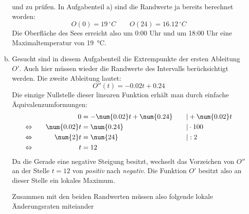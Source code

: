 \begin{exercise}
\begin{enumerate}[a)]
            und zu prüfen.
            In Aufgabenteil a) sind die Randwerte
            ja bereits berechnet worden:
            \begin{equation*}
              O(0)=\num{19}\,{}^\circ C
              \qquad
              O(24)=\num{16.12}\,{}^\circ C
            \end{equation*}
            Die Oberfläche des Sees erreicht also um
            0:00 Uhr und um 18:00 Uhr eine
            Maximaltemperatur von \SI{19}{\celsius}.
      \item Gesucht sind in diesem Aufgabenteil
            die Extrempunkte der ersten Ableitung
            $O'$. Auch hier müssen wieder die
            Randwerte des Intervalls berücksichtigt
            werden.
            Die zweite Ableitung lautet:
            \begin{equation*}
              O''(t)=-\num{0.02}t+\num{0.24}
            \end{equation*}
            Die einzige Nullstelle dieser linearen
            Funktion erhält man durch einfache
            Äquivalenzumformungen:
            \begin{alignat*}{3}
              \relax&\quad
              &
              0&=-\num{0.02}t+\num{0.24}
              &
              \quad&|+\num{0.02}t
              \\
              \Leftrightarrow&\quad
              &
              \num{0.02}t&=\num{0.24}
              &
              \quad&|\cdot100
              \\
              \Leftrightarrow&\quad
              &
              \num{2}t&=\num{24}
              &
              \quad&|:2
              \\
              \Leftrightarrow&\quad
              &
              t&=12
              &
              \quad&\relax
            \end{alignat*}
            Da die Gerade eine negative Steigung
            besitzt, wechselt das Vorzeichen
            von $O''$ an der Stelle $t=12$ von
            \textit{positiv} nach \textit{negativ}.
            Die Funktion $O'$ besitzt also an
            dieser Stelle ein lokales Maximum.
            \par
            Zusammen mit den beiden Randwerten müssen also
            folgende lokale Änderungsraten miteiander

\end{enumerate}
\end{exercise}
